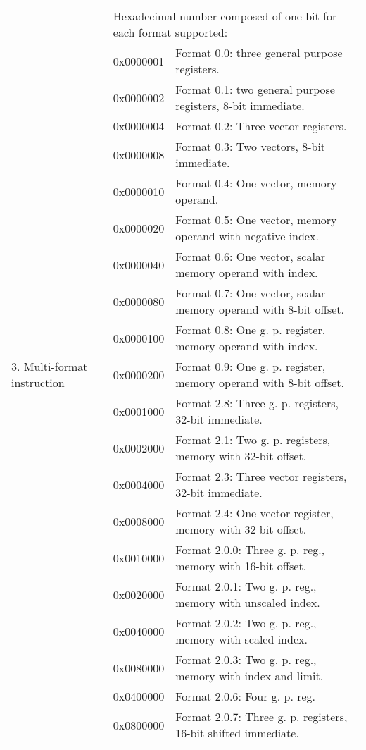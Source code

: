 \documentclass[forwardcom.tex]{subfiles}
\begin{document}
\begin{longtable} {|p{18mm}|p{20mm} p{80mm}|}
\multirow{27}{*}{\parbox[t]{18mm}{3. Multi-format instruction}} 
  &  \multicolumn{2}{|l|}{
     Hexadecimal number composed of one bit for each format supported:} \\
  &  0x0000001 & Format 0.0: three general purpose registers. \\
  &  0x0000002 & Format 0.1: two general purpose registers, 8-bit immediate. \\
  &  0x0000004 & Format 0.2: Three vector registers. \\
  &  0x0000008 & Format 0.3: Two vectors, 8-bit immediate. \\
  &  0x0000010 & Format 0.4: One vector, memory operand. \\
  &  0x0000020 & Format 0.5: One vector, memory operand with negative index. \\
  &  0x0000040 & Format 0.6: One vector, scalar memory operand with index. \\
  &  0x0000080 & Format 0.7: One vector, scalar memory operand with 8-bit offset. \\
  &  0x0000100 & Format 0.8: One g. p. register, memory operand with index. \\
  &  0x0000200 & Format 0.9: One g. p. register, memory operand with 8-bit offset. \\
  
  &  0x0001000 & Format 2.8: Three g. p. registers, 32-bit immediate. \\
  &  0x0002000 & Format 2.1: Two g. p. registers, memory with 32-bit offset. \\
  &  0x0004000 & Format 2.3: Three vector registers, 32-bit immediate. \\
  &  0x0008000 & Format 2.4: One vector register, memory with 32-bit offset. \\
  
  &  0x0010000 & Format 2.0.0: Three g. p. reg., memory with 16-bit offset. \\
  &  0x0020000 & Format 2.0.1: Two g. p. reg., memory with unscaled index. \\
  &  0x0040000 & Format 2.0.2: Two g. p. reg., memory with scaled index. \\
  &  0x0080000 & Format 2.0.3: Two g. p. reg., memory with index and limit.\\  
  &  0x0400000 & Format 2.0.6: Four g. p. reg.\\
  &  0x0800000 & Format 2.0.7: Three g. p. registers, 16-bit shifted immediate. \\  


\end{longtable}
\end{document}
